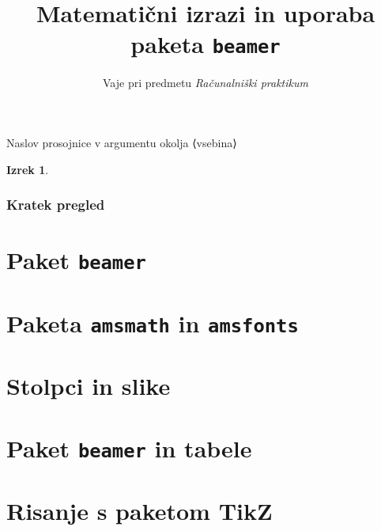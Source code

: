 \documentclass{beamer}
\begin{document}
\begin{frame}{Naslov prosojnice v argumentu okolja}
  ⟨vsebina⟩
\end{frame}

{\theoremstyle{plain}
\newtheorem{izrek}{Izrek}
}
\begin{izrek}
\end{izrek}

\title{Matematični izrazi in uporaba paketa \texttt{beamer}}
\subtitle{Vaje pri predmetu \emph{Računalniški praktikum}}
\date{}
\begin{frame}
    \titlepage
\end{frame}

\begin{frame}
    \frametitle{Kratek pregled}
    \tableofcontents%
\end{frame}





\section{Paket \texttt{beamer}}

\section{Paketa \texttt{amsmath} in \texttt{amsfonts}}

\section{Stolpci in slike}

\section{Paket \texttt{beamer} in tabele}

\section{Risanje s paketom TikZ}

\end{document}
